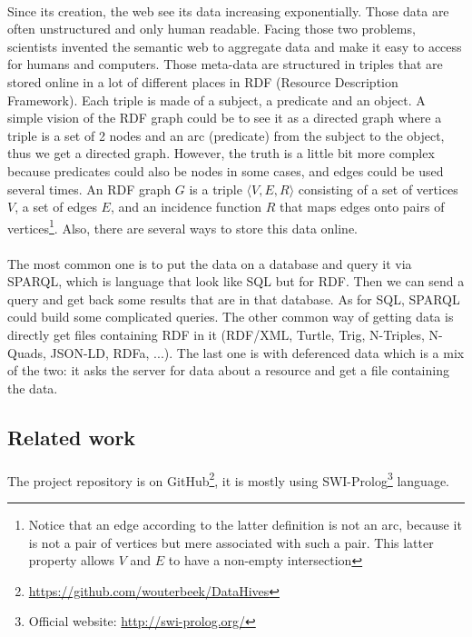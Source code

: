 \documentclass{article}
\begin{document}
		\paragraph{} %
			Since its creation, the web see its data increasing exponentially.
			Those data are often unstructured and only human readable.
			Facing those two problems, scientists invented the semantic web to aggregate data
			and make it easy to access for humans and computers.\cite{Grigoris12}
			Those meta-data are structured in triples that are stored online in a lot of different places in RDF
			(Resource Description Framework).
			Each triple is made of a subject, a predicate and an object.
			A simple vision of the RDF graph could be to see it as a directed graph where a triple is a set of 2 nodes and an arc
			(predicate) from the subject to the object, thus we get a directed graph.
			However, the truth is a little bit more complex because predicates could also be nodes in some cases,
			and edges could be used several times.
			An RDF graph $G$ is a triple $\langle V, E, R \rangle$ consisting of a set of vertices $V$, a set of edges $E$,
			and an incidence function $R$ that maps edges onto pairs of vertices\footnote{
				Notice that an edge according to the latter definition is not an arc,
				because it is not a pair of vertices but mere associated with such a pair.
				This latter property allows $V$ and $E$ to have a non-empty intersection
			}.
			Also, there are several ways to store this data online.
		\paragraph{} %
			The most common one is to put the data on a database and query it via SPARQL,
			which is language that look like SQL but for RDF.
			Then we can send a query and get back some results that are in that database.
			As for SQL, SPARQL could build some complicated queries.
			The other common way of getting data is directly get files containing RDF in it
			(RDF/XML, Turtle, Trig, N-Triples, N-Quads, JSON-LD, RDFa, ...).
			The last one is with deferenced data which is a mix of the two:
			it asks the server for data about a resource and get a file containing the data.
	\subsection{Related work}
		\paragraph{}
			The project repository is on GitHub\footnote{ \url{https://github.com/wouterbeek/DataHives}},
			it is mostly using SWI-Prolog\footnote{ Official website: \url{http://swi-prolog.org/}} language.
\end{document}
